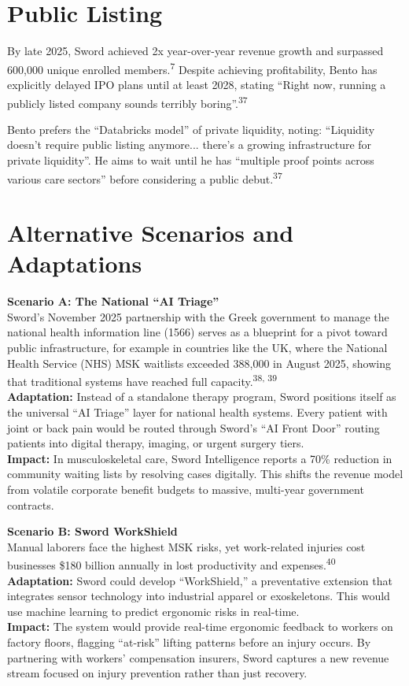 \documentclass[12pt]{article}
\begin{document}
\section{Public Listing}
By late 2025, Sword achieved 2x year-over-year revenue growth and surpassed 600,000 unique enrolled members.\textsuperscript{7} Despite achieving profitability, Bento has explicitly delayed IPO plans until at least 2028, stating ``Right now, running a publicly listed company sounds terribly boring''.\textsuperscript{37}

Bento prefers the ``Databricks model'' of private liquidity, noting: ``Liquidity doesn't require public listing anymore... there's a growing infrastructure for private liquidity''. He aims to wait until he has ``multiple proof points across various care sectors'' before considering a public debut.\textsuperscript{37}

\section{Alternative Scenarios and Adaptations}
\textbf{Scenario A: The National ``AI Triage''}\\
Sword’s November 2025 partnership with the Greek government to manage the national health information line (1566) serves as a blueprint for a pivot toward public infrastructure, for example in countries like the UK, where the National Health Service (NHS) MSK waitlists exceeded 388,000 in August 2025, showing that traditional systems have reached full capacity.\textsuperscript{38, 39}\\
\textbf{Adaptation:} Instead of a standalone therapy program, Sword positions itself as the universal ``AI Triage'' layer for national health systems. Every patient with joint or back pain would be routed through Sword’s ``AI Front Door'' routing patients into digital therapy, imaging, or urgent surgery tiers.\\
\textbf{Impact:} In musculoskeletal care, Sword Intelligence reports a 70\% reduction in community waiting lists by resolving cases digitally. This shifts the revenue model from volatile corporate benefit budgets to massive, multi-year government contracts.

\vspace{0.5em}
\noindent \textbf{Scenario B: Sword WorkShield}\\
Manual laborers face the highest MSK risks, yet work-related injuries cost businesses \$180 billion annually in lost productivity and expenses.\textsuperscript{40}\\
\textbf{Adaptation:} Sword could develop ``WorkShield,'' a preventative extension that integrates sensor technology into industrial apparel or exoskeletons. This would use machine learning to predict ergonomic risks in real-time.\\
\textbf{Impact:} The system would provide real-time ergonomic feedback to workers on factory floors, flagging ``at-risk'' lifting patterns before an injury occurs. By partnering with workers' compensation insurers, Sword captures a new revenue stream focused on injury prevention rather than just recovery.
\end{document}
